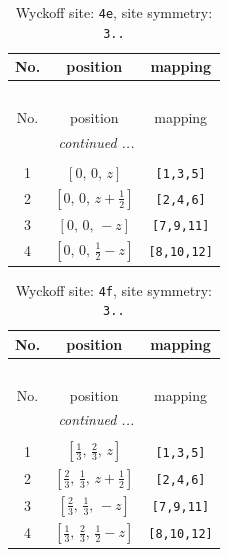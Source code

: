\documentclass[fleqn,8pt]{jsarticle}
\begin{document}
\begin{longtable}{ccc}
\caption{Wyckoff site: {\tt 4e}, site symmetry: {\tt 3..}}
 \\
 \hline \hline
No. & position & mapping \\ \hline \endfirsthead

\multicolumn{2}{l}{\tablename\ \thetable{}} \\
 \hline \hline
No. & position & mapping \\ \hline \endhead

 \hline \hline
\multicolumn{2}{r}{\footnotesize\it continued ...} \\ \endfoot

 \hline \hline
\multicolumn{2}{r}{} \\ \endlastfoot

1 & $\left[ 0,\, 0,\, z \right]$ & {\tt [1,3,5]} \\ \hline
2 & $\left[ 0,\, 0,\, z + \frac{1}{2} \right]$ & {\tt [2,4,6]} \\ \hline
3 & $\left[ 0,\, 0,\, - z \right]$ & {\tt [7,9,11]} \\ \hline
4 & $\left[ 0,\, 0,\, \frac{1}{2} - z \right]$ & {\tt [8,10,12]} \\
\end{longtable}
\renewcommand{\arraystretch}{1.2}
\begin{longtable}{ccc}
\caption{Wyckoff site: {\tt 4f}, site symmetry: {\tt 3..}}
 \\
 \hline \hline
No. & position & mapping \\ \hline \endfirsthead

\multicolumn{2}{l}{\tablename\ \thetable{}} \\
 \hline \hline
No. & position & mapping \\ \hline \endhead

 \hline \hline
\multicolumn{2}{r}{\footnotesize\it continued ...} \\ \endfoot

 \hline \hline
\multicolumn{2}{r}{} \\ \endlastfoot

1 & $\left[ \frac{1}{3},\, \frac{2}{3},\, z \right]$ & {\tt [1,3,5]} \\ \hline
2 & $\left[ \frac{2}{3},\, \frac{1}{3},\, z + \frac{1}{2} \right]$ & {\tt [2,4,6]} \\ \hline
3 & $\left[ \frac{2}{3},\, \frac{1}{3},\, - z \right]$ & {\tt [7,9,11]} \\ \hline
4 & $\left[ \frac{1}{3},\, \frac{2}{3},\, \frac{1}{2} - z \right]$ & {\tt [8,10,12]} \\
\end{longtable}
\end{document}

